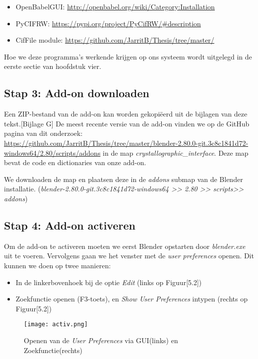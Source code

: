 \begin{itemize}
\item OpenBabelGUI: \url{http://openbabel.org/wiki/Category:Installation}
\item PyCIFRW: \url{https://pypi.org/project/PyCifRW/#description}
\item CifFile module: \url{https://github.com/JarritB/Thesis/tree/master/} 
\end{itemize}   

Hoe we deze programma's werkende krijgen op ons systeem wordt uitgelegd in de eerste sectie van hoofdstuk vier. 
\par

\subsection{Stap 3: Add-on downloaden}
Een ZIP-bestand van de add-on kan worden gekopiëerd uit de bijlagen van deze tekst.[Bijlage G] De meest recente versie van de add-on vinden we op de GitHub pagina van dit onderzoek: \url{https://github.com/JarritB/Thesis/tree/master/blender-2.80.0-git.3c8c1841d72-windows64/2.80/scripts/addons} in de map \textit{crystallographic\_interface}. Deze map bevat de code en dictionaries van onze add-on.
\par  
We downloaden de map en plaatsen deze in de \textit{addons} submap van de Blender installatie. (\textit{blender-2.80.0-git.3c8c1841d72-windows64 \textgreater \textgreater{} 2.80 \textgreater \textgreater{} scripts\textgreater \textgreater{} addons}) 

\subsection{Stap 4: Add-on activeren}
Om de add-on te activeren moeten we eerst Blender opstarten door \textit{blender.exe} uit te voeren. Vervolgens gaan we het venster met de \textit{user preferences} openen. Dit kunnen we doen op twee manieren: 
\begin{itemize}
\item In de linkerbovenhoek bij de optie \textit{Edit} (links op Figuur[5.2])
\item Zoekfunctie openen (F3-toets), en \textit{Show User Preferences} intypen (rechts op Figuur[5.2]) 
\end{itemize}     

\begin{figure}[h]
\begin{center}
\texttt{[image: activ.png]}
\caption{Openen van de \textit{User Preferences} via GUI(links) en Zoekfunctie(rechts)}
\end{center}
\end{figure}
 
